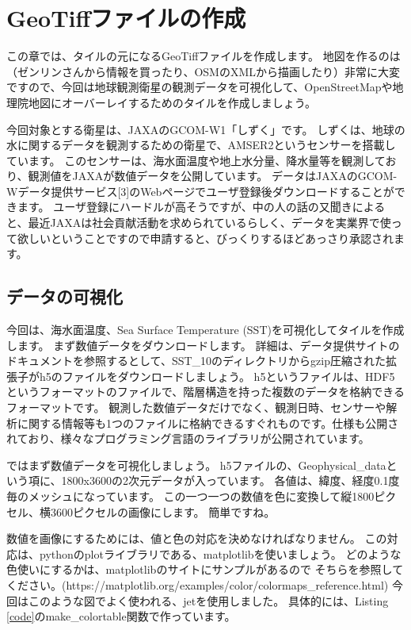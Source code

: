\chapter*{GeoTiffファイルの作成}

この章では、タイルの元になるGeoTiffファイルを作成します。
地図を作るのは（ゼンリンさんから情報を買ったり、OSMのXMLから描画したり）非常に大変ですので、今回は地球観測衛星の観測データを可視化して、OpenStreetMapや地理院地図にオーバーレイするためのタイルを作成しましょう。

今回対象とする衛星は、JAXAのGCOM-W1「しずく」です。
しずくは、地球の水に関するデータを観測するための衛星で、AMSER2というセンサーを搭載しています。
このセンサーは、海水面温度や地上水分量、降水量等を観測しており、観測値をJAXAが数値データを公開しています。
データはJAXAのGCOM-Wデータ提供サービス[3]のWebページでユーザ登録後ダウンロードすることができます。
ユーザ登録にハードルが高そうですが、中の人の話の又聞きによると、最近JAXAは社会貢献活動を求められているらしく、データを実業界で使って欲しいということですので申請すると、びっくりするほどあっさり承認されます。

\section*{データの可視化}
今回は、海水面温度、Sea Surface Temperature (SST)を可視化してタイルを作成します。
まず数値データをダウンロードします。
詳細は、データ提供サイトのドキュメントを参照するとして、SST\_10のディレクトリからgzip圧縮された拡張子がh5のファイルをダウンロードしましょう。
h5というファイルは、HDF5というフォーマットのファイルで、階層構造を持った複数のデータを格納できるフォーマットです。
観測した数値データだけでなく、観測日時、センサーや解析に関する情報等も1つのファイルに格納できるすぐれものです。仕様も公開されており、様々なプログラミング言語のライブラリが公開されています。

ではまず数値データを可視化しましょう。
h5ファイルの、Geophysical\_dataという項に、1800x3600の2次元データが入っています。
各値は、緯度、経度0.1度毎のメッシュになっています。
この一つ一つの数値を色に変換して縦1800ピクセル、横3600ピクセルの画像にします。
簡単ですね。

数値を画像にするためには、値と色の対応を決めなければなりません。
この対応は、pythonのplotライブラリである、matplotlibを使いましょう。
どのような色使いにするかは、matplotlibのサイトにサンプルがあるので
そちらを参照してください。(https://matplotlib.org/examples/color/colormaps\_reference.html) 今回はこのような図でよく使われる、jetを使用しました。
具体的には、Listing \ref{code}のmake\_colortable関数で作っています。


